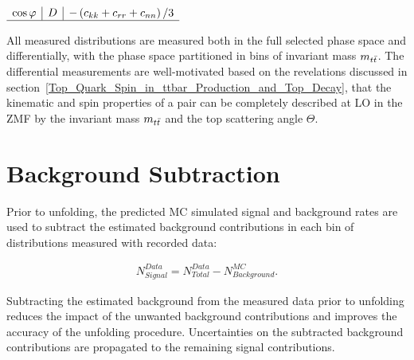 \begin{table}[htb]
\begin{center}
\begin{adjustbox}{scale=0.85,center}
\begin{math}
\begin{array}{l|l|l}
\cos \varphi & D & -\left(c_{k k}+c_{r r}+c_{n n}\right) / 3 \\
\hline 
\end{array}
\end{math}
\end{adjustbox}
\label{observables_coefficients}
\end{center}
\end{table}
All measured distributions are measured both in the full selected phase space and differentially, with the phase space partitioned in bins of \ttbar invariant mass $m_{t\bar{t}}$.
The differential measurements are well-motivated based on the revelations discussed in section~\ref{Top_Quark_Spin_in_ttbar_Production_and_Top_Decay}, that the kinematic and spin properties of a \ttbar pair can be completely described at LO in the \ttbar ZMF by the invariant mass $m_{t\bar{t}}$ and the top scattering angle $\Theta$.

\clearpage
\section{Background Subtraction}
\label{Background_Subtraction}
Prior to unfolding, the predicted MC simulated signal and background rates are used to subtract the estimated background contributions in each bin of distributions measured with recorded data:
\begin{linenomath*}
\begin{align}
N^{Data}_{Signal} = N^{Data}_{Total} - N^{MC}_{Background}.
\label{Data_Background_Subtraction}
\end{align}
\end{linenomath*}
Subtracting the estimated background from the measured data prior to unfolding reduces the impact of the unwanted background contributions and improves the accuracy of the unfolding procedure.
Uncertainties on the subtracted background contributions are propagated to the remaining signal contributions.

